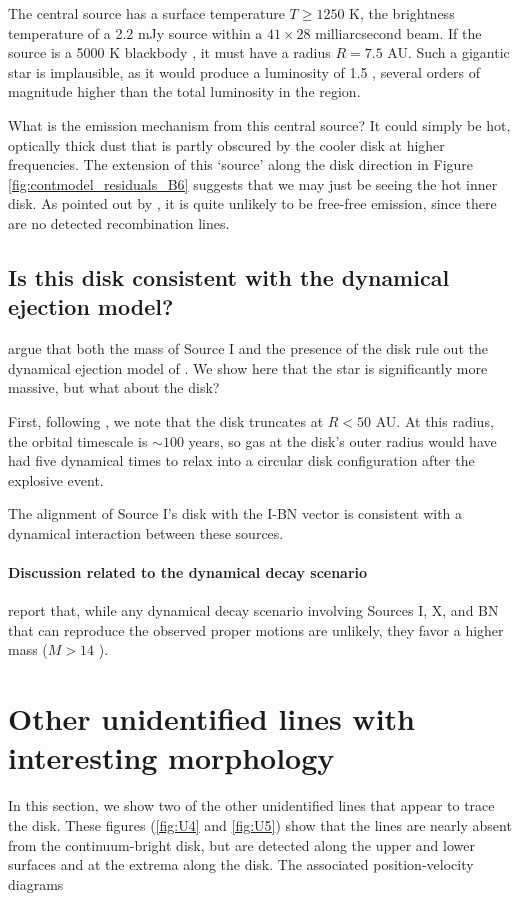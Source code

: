 \documentclass[twocolumn]{aastex61}
\begin{document}
The central source has a surface temperature $T\geq1250$ K, the brightness
temperature of a 2.2 mJy source within a $41\times28$ milliarcsecond beam.  If
the source is a 5000 K blackbody \citep[e.g.,][]{Testi2010a}, it must have a
radius $R=7.5$ AU.  Such a gigantic star is implausible, as it would produce
a luminosity of 1.5 \lsun, several orders of magnitude higher than
the total luminosity in the region.

{\color{red}
What is the emission mechanism from this central source?
It could simply be hot, optically thick dust that is partly obscured by the
cooler disk at higher frequencies.  The  extension of this `source'
along the disk direction in Figure \ref{fig:contmodel_residuals_B6}
suggests that we may just be seeing the hot inner disk.
As pointed out by \citet{Plambeck2016a}, it is quite unlikely to be
free-free emission, since there are no detected recombination lines.
}

\subsection{Is this disk consistent with the dynamical ejection model?}
\citet{Plambeck2016a} argue that both the mass of Source I and the presence of the disk
rule out the dynamical ejection model of \citet{Bally2011a}.  We show here that
the star is significantly more massive, but what about the disk?

First, following \citet{Bally2011a}, we note that the disk truncates at $R<50$
AU.  At this radius, the orbital timescale is $\sim100$ years, so gas at the
disk's outer radius would have had five dynamical times to relax into a
circular disk configuration after the explosive event.

The alignment of Source I's disk with the I-BN vector is consistent with
a dynamical interaction between these sources.

\paragraph{Discussion related to the dynamical decay scenario}
\citet{Farias2017a} report that, while any dynamical decay scenario
involving Sources I, X, and BN that can reproduce the observed 
proper motions are unlikely, they favor a higher mass ($M>14$ \msun).



\appendix
\section{Other unidentified lines with interesting morphology}
\label{sec:otherlines}
In this section, we show two of the other unidentified lines that appear to trace
the disk.  These figures (\ref{fig:U4} and \ref{fig:U5}) show that the lines
are nearly absent from the continuum-bright disk, but are detected along the upper and
lower surfaces and at the extrema along the disk.  The associated position-velocity diagrams
\end{document}
